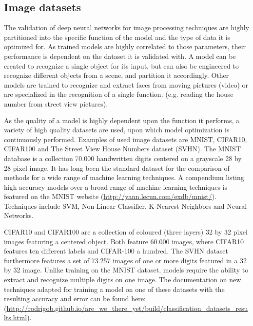 \subsection{Image datasets \label{subsec:imdata}}
The validation of deep neural networks for image processing techniques are highly partitioned into the specific function of the model and the type of data it is optimized for. As trained models are highly correlated to those parameters, their performance is dependent on the dataset it is validated with. A model can be created to recognize a single object for its input, but can also be engineered to recognize different objects from a scene, and partition it accordingly. Other models are trained to recognize and extract faces from moving pictures (video) or are specialized in the recognition of a single function. (e.g. reading the house number from street view pictures). 


As the quality of a model is highly dependent upon the function it performs, a variety of high quality datasets are used, upon which model optimization is continuously performed. Examples of used image datasets are MNIST, CIFAR10, CIFAR100 and The Street View House Numbers dataset (SVHN). The MNIST database is a collection 70.000 handwritten digits centered on a grayscale 28 by 28 pixel image.  It has long been the standard dataset for the comparison of methods for a wide range of machine learning techniques. A compendium listing high accuracy models over a broad range of machine learning techniques is featured on the MNIST website (\url{http://yann.lecun.com/exdb/mnist/}). Techniques include SVM, Non-Linear Classifier, K-Nearest Neighbors and Neural Networks. 

CIFAR10 and CIFAR100 are a collection of coloured (three layers) 32 by 32 pixel images featuring a centered object.  Both feature 60.000 images, where CIFAR10 features ten different labels and CIFAR-100 a hundred. The SVHN dataset furthermore features a set of 73.257 images of one or more digits featured in a 32 by 32 image. Unlike training on the MNIST dataset, models require the ability to extract and recognize multiple digits on one image. The documentation on new techniques adapted for training a model on one of these datasets with the resulting accuracy and error can be found here:   (\url{http://rodrigob.github.io/are_we_there_yet/build/classification_datasets_results.html}).


